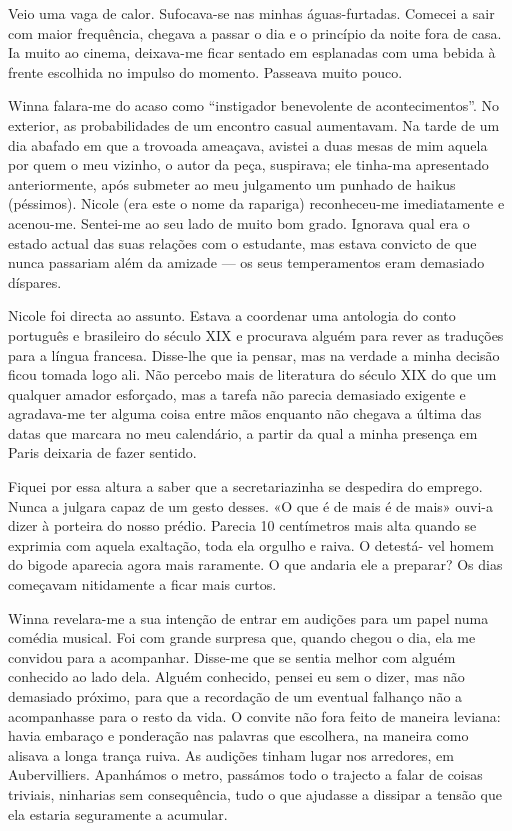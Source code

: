 Veio uma vaga de calor. Sufocava-se nas minhas águas-furtadas. Comecei a sair com maior frequência, chegava a passar o dia e
o princípio da noite fora de casa. Ia muito ao cinema, deixava-me ficar
sentado em esplanadas com uma bebida à frente escolhida no impulso do
momento. Passeava muito pouco.

Winna falara-me do acaso como ``instigador benevolente de
acontecimentos''. No exterior, as probabilidades de um encontro casual
aumentavam. Na tarde de um dia abafado em que a trovoada ameaçava,
avistei a duas mesas de mim
aquela por quem o meu vizinho, o autor da peça, suspirava; ele tinha-ma
apresentado anteriormente, após submeter ao meu julgamento um punhado de
haikus (péssimos). Nicole (era este o nome da rapariga) reconheceu-me
imediatamente e acenou-me. Sentei-me ao seu lado de muito bom grado.
Ignorava qual era o estado actual das suas relações com o estudante, mas
estava convicto de que nunca passariam além da amizade
--- os seus temperamentos eram demasiado díspares.

Nicole foi directa ao assunto. Estava a coordenar uma antologia do conto
português e brasileiro do século XIX e procurava alguém para rever as
traduções para a língua francesa. Disse-lhe que ia pensar, mas na
verdade a minha decisão ficou tomada logo ali. Não percebo mais de
literatura do século XIX do que um qualquer amador esforçado, mas a
tarefa não parecia demasiado exigente e agradava-me ter alguma coisa
entre mãos enquanto não chegava a última das datas que marcara no meu
calendário, a partir da qual a minha presença em Paris deixaria de fazer
sentido.

Fiquei por essa altura a saber que a secretariazinha se despedira do
emprego. Nunca a julgara capaz de um gesto desses.
«O que é de mais é de mais» ouvi-a dizer à porteira do nosso prédio.
Parecia 10 centímetros mais alta quando se exprimia com aquela
exaltação, toda ela orgulho e raiva. O detestá- vel homem do bigode
aparecia agora mais raramente. O que andaria ele a preparar? Os dias
começavam nitidamente a ficar mais curtos.

Winna revelara-me a sua intenção de entrar em audições para um papel
numa comédia musical. Foi com grande surpresa que, quando chegou o
dia, ela me convidou para a acompanhar. Disse-me que se sentia melhor
com alguém conhecido ao lado dela. Alguém conhecido, pensei eu sem
o dizer, mas não demasiado próximo, para que a recordação de um eventual
falhanço não a acompanhasse para o resto da vida. O convite não fora
feito de maneira leviana: havia embaraço e ponderação nas palavras que
escolhera, na maneira como alisava a longa trança ruiva. As audições
tinham lugar nos arredores, em Aubervilliers. Apanhámos o metro,
passámos todo o trajecto a falar de coisas triviais, ninharias sem
consequência, tudo o que ajudasse a dissipar a tensão que ela estaria
seguramente a acumular.

